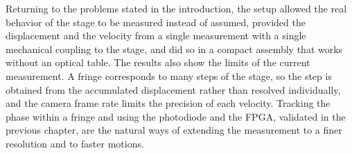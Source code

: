 Returning to the problems stated in the introduction, the setup allowed the real behavior of the stage to be measured instead of assumed, provided the displacement and the velocity from a single measurement with a single mechanical coupling to the stage, and did so in a compact assembly that works without an optical table. The results also show the limits of the current measurement. A fringe corresponds to many steps of the stage, so the step is obtained from the accumulated displacement rather than resolved individually, and the camera frame rate limits the precision of each velocity. Tracking the phase within a fringe and using the photodiode and the FPGA, validated in the previous chapter, are the natural ways of extending the measurement to a finer resolution and to faster motions.
